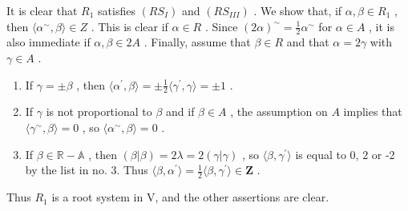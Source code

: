 It is clear that \(R_{1}\) satisfies \((RS_{I})\) and \((RS_{III})\) . We show that, if \(\alpha, \beta \in R_{1}\) , then \(\langle\alpha^{\sim}, \beta\rangle \in Z\) . This is clear if \(\alpha \in R\) . Since \((2\alpha)^{\sim} = \frac{1}{2}\alpha^{\sim}\) for \(\alpha \in A\) , it is also immediate if \(\alpha, \beta \in 2A\) . Finally, assume that \(\beta \in R\) and that \(\alpha = 2\gamma\) with \(\gamma \in A\) .

\begin{enumerate}
\def\labelenumi{\arabic{enumi})}
\item
  If \(\gamma = \pm \beta\) , then \(\langle \alpha^{\prime},\beta \rangle = \pm \frac{1}{2}\langle \gamma^{\prime},\gamma \rangle = \pm 1\) .
\item
  If \(\gamma\) is not proportional to \(\beta\) and if \(\beta \in A\) , the assumption on \(A\) implies that \(\langle \gamma^{\sim},\beta \rangle = 0\) , so \(\langle \alpha^{\sim},\beta \rangle = 0\) .
\item
  If \(\beta \in \mathbb{R} - \mathbb{A}\) , then \((\beta |\beta) = 2\lambda = 2(\gamma |\gamma)\) , so \(\langle \beta, \gamma^{\prime} \rangle\) is equal to 0, 2 or -2 by the list in no. 3. Thus \(\langle \beta, \alpha^{\prime} \rangle = \frac{1}{2}\langle \beta, \gamma^{\prime} \rangle \in \mathbf{Z}\) .
\end{enumerate}

Thus \(R_{1}\) is a root system in V, and the other assertions are clear.

